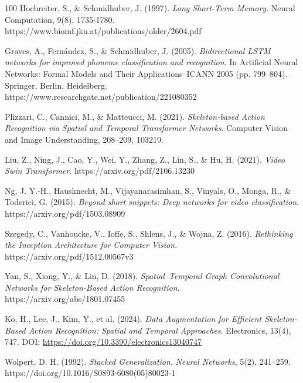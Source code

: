 \documentclass[journal,onecolumn, 11pt]{IEEEtran}
\begin{document}
\begin{thebibliography}{100}
Hochreiter, S., \& Schmidhuber, J. (1997). 
\textit{Long Short-Term Memory}. Neural Computation, 9(8), 1735-1780. https://www.bioinf.jku.at/publications/older/2604.pdf

Graves, A., Fernández, S., \& Schmidhuber, J. (2005). 
\textit{Bidirectional LSTM networks for improved phoneme classification and recognition}. In Artificial Neural Networks: Formal Models and Their Applications–ICANN 2005 (pp. 799–804). Springer, Berlin, Heidelberg.
https://www.researchgate.net/publication/221080352

Plizzari, C., Cannici, M., \& Matteucci, M. (2021). 
\textit{Skeleton-based Action Recognition via Spatial and Temporal Transformer Networks}. 
Computer Vision and Image Understanding, 208–209, 103219.

Liu, Z., Ning, J., Cao, Y., Wei, Y., Zhang, Z., Lin, S., \& Hu, H. (2021).
\textit{Video Swin Transformer}.
https://arxiv.org/pdf/2106.13230

Ng, J. Y.-H., Hausknecht, M., Vijayanarasimhan, S., Vinyals, O., Monga, R., \& Toderici, G. (2015). \textit{Beyond short snippets: Deep networks for video classification}.
https://arxiv.org/pdf/1503.08909

Szegedy, C., Vanhoucke, V., Ioffe, S., Shlens, J., \& Wojna, Z. (2016).
\textit{Rethinking the Inception Architecture for Computer Vision}.
https://arxiv.org/pdf/1512.00567v3

Yan, S., Xiong, Y., \& Lin, D. (2018).
\textit{Spatial–Temporal Graph Convolutional Networks for Skeleton-Based Action Recognition}.
https://arxiv.org/abs/1801.07455

Ko, H., Lee, J., Kim, Y., et al. (2024). 
\textit{Data Augmentation for Efficient Skeleton-Based Action Recognition: Spatial and Temporal Approaches}. 
Electronics, 13(4), 747. 
DOI: \url{https://doi.org/10.3390/electronics13040747}

Wolpert, D. H. (1992). \textit{Stacked Generalization}. \emph{Neural Networks}, 5(2), 241–259. https://doi.org/10.1016/S0893-6080(05)80023-1




\end{thebibliography}
\end{document}
